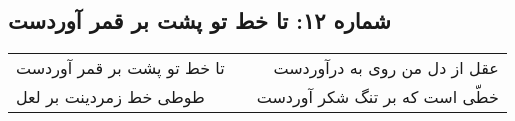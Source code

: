 \begin{center}
\section*{شماره ۱۲: تا خط تو پشت بر قمر آوردست}
\label{sec:012}
\begin{longtable}{l p{0.5cm} r}
تا خط تو پشت بر قمر آوردست
&&
عقل از دل من روی به درآوردست
\\
طوطی خط زمردینت بر لعل
&&
خطّی است که بر تنگ شکر آوردست
\\
\end{longtable}
\end{center}
